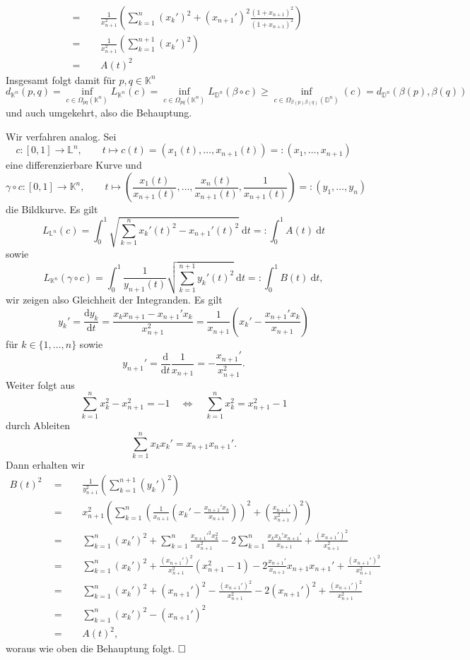 \documentclass[11pt]{book}
\numberwithin{dummy}{section}
\theoremstyle{nonumberbreak}
\newenvironment{prob}[1][]{\ifthenelse{\equal{#1}{}}{\problem}{\problem[#1]}\rm}{\endproblem}
\newenvironment{sol}[1][]{\ifthenelse{\equal{#1}{}}{\solution}{\solution[#1]}\rm}{\endsolution}
\newcommand{\Loid}{\mathbb{L}}
\newcommand{\D}{\mathbb{D}}
\newcommand{\la}{\longrightarrow}
\begin{document}
\begin{spacing}{1.4}
\begin{prob}
\begin{sol}
\begin{compactenum}
\begin{alignat*}{5}
&=&& \ \ \frac{1}{x_{n+1}^2} \left( \sum_{k=1}^n (x_k')^2 + (x_{n+1}')^2  \frac{(1+x_{n+1})^2}{(1+x_{n+1})^2} \right) \\
&=&& \ \ \frac{1}{x_{n+1}^2} \left( \sum_{k=1}^{n+1} (x_k')^2\right)\\
&=&& \ \ A(t)^2
\end{alignat*}
Insgesamt folgt damit für $p,q \in \mathbb{K}^n$
$$d_{\mathbb{K}^n}(p,q) = \inf_{c \in \Omega_{pq}(\mathbb{K}^n)} L_{\mathbb{K}^n}(c) = \inf_{c \in \Omega_{pq}(\mathbb{K}^n)} L_{\mathbb{D}^n}(\beta \circ c) \geqslant \inf_{c \in \Omega_{\beta(p)\beta(q)}(\mathbb{D}^n)}(c) = d_{\D^n}(\beta(p), \beta(q))$$
und auch umgekehrt, also die Behauptung.

\item Wir verfahren analog. Sei
$$c:[0,1] \la \Loid^n, \qquad t \mapsto c(t)=(x_1(t), \ldots, x_{n+1}(t)) =: (x_1, \ldots, x_{n+1})$$
eine differenzierbare Kurve und
$$\gamma \circ c: [0,1] \la \mathbb{K}^n, \qquad t \mapsto \left(\frac{x_1(t)}{x_{n+1}(t)}, \ldots, \frac{x_n(t)}{x_{n+1}(t)}, \frac{1}{x_{n+1}(t)}\right) =: (y_1, \ldots, y_n)$$
die Bildkurve. Es gilt
$$L_{\Loid^n}(c) = \int_0^1 \sqrt{\sum_{k=1}^n x_k'(t)^2 - x_{n+1}'(t)^2} \ \mathrm{d}t =: \int_0^1 A(t) \ \mathrm{d}t$$
sowie
$$L_{\mathbb{K}^n}(\gamma \circ c) = \int_0^1 \frac{1}{y_{n+1}(t)} \sqrt{\sum_{k=1}^{n+1} y_k'(t)^2} \ \mathrm{d}t =: \int_0^1 B(t) \ \mathrm{d}t,$$
wir zeigen also Gleichheit der Integranden. Es gilt
$$y_k'= \frac{\mathrm{d}y_k}{\mathrm{d}t} = \frac{x_k x_{n+1} - x_{n+1}' x_k}{x_{n+1}^2} = \frac{1}{x_{n+1}} \left( x_k' - \frac{x_{n+1}' x_k}{x_{n+1}}\right)$$
für $k \in \{1, \ldots, n\}$ sowie 
$$y_{n+1}' = \frac{\mathrm{d}}{\mathrm{d}t} \frac{1}{x_{n+1}} = - \frac{x_{n+1}'}{x_{n+1}^2}.$$
Weiter folgt aus
$$\sum_{k=1}^n x_k^2 - x_{n+1}^2 = -1 \quad \Longleftrightarrow \quad \sum_{k=1}^n x_k^2 = x_{n+1}^2 -1$$
durch Ableiten 
$$\sum_{k=1}^n x_k x_k' = x_{n+1} x_{n+1}'.$$
Dann erhalten wir 
\begin{alignat*}{5}
B(t)^2 \ \ &=&& \ \ \frac{1}{y_{n+1}^2} \left( \sum_{k=1}^{n+1} (y_k')^2\right) \\
&=&& \ \ x_{n+1}^2 \left(\sum_{k=1}^n \left( \frac{1}{x_{n+1}} \left( x_k' - \frac{x_{n+1}'x_k}{x_{n+1}}\right) \right)^2 + \left( \frac{x_{n+1}'}{x_{n+1}^2}\right)^2 \right) \\
&=&& \ \ \sum_{k=1}^n (x_k')^2 + \sum_{k=1}^n \frac{x_{n+1}'^2 x_k^2}{x_{n+1}^2} - 2 \sum_{k=1}^n \frac{x_k x_k' x_{n+1}'}{x_{n+1}} +  \frac{(x_{n+1}')^2}{x_{n+1}^2} \\
&=&& \ \ \sum_{k=1}^n (x_k')^2 + \frac{(x_{n+1}')^2}{x_{n+1}^2} \left( x_{n+1}^2-1\right) - 2 \frac{x_{n+1}'}{x_{n+1}} x_{n+1} x_{n+1}' + \frac{(x_{n+1}')^2}{x_{n+1}^2} \\
&=&& \ \ \sum_{k=1}^n (x_k')^2 +(x_{n+1}')^2 - \frac{(x_{n+1}')^2}{x_{n+1}^2} - 2 (x_{n+1}')^2 + \frac{(x_{n+1}')^2}{x_{n+1}^2} \\
&=&& \ \ \sum_{k=1}^n (x_k')^2 - (x_{n+1}')^2 \\
&=&& \ \ A(t)^2,
\end{alignat*}
woraus wie oben die Behauptung folgt. $\hfill \Box$



\end{compactenum}
\end{sol}
\end{prob}
\end{spacing}
\end{document}
